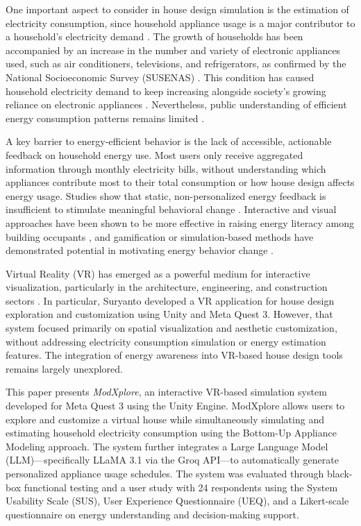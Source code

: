 \documentclass[conference]{IEEEtran}
\begin{document}
One important aspect to consider in house design simulation is the estimation of electricity consumption, since household appliance usage is a major contributor to a household's electricity demand \cite{hermadiana2025integrasi, salsabila2026pengaruh}. The growth of households has been accompanied by an increase in the number and variety of electronic appliances used, such as air conditioners, televisions, and refrigerators, as confirmed by the National Socioeconomic Survey (SUSENAS) \cite{bpssusenas}. This condition has caused household electricity demand to keep increasing alongside society's growing reliance on electronic appliances \cite{databoks2023internet}. Nevertheless, public understanding of efficient energy consumption patterns remains limited \cite{konsumsiEnergi2024}.

A key barrier to energy-efficient behavior is the lack of accessible, actionable feedback on household energy use. Most users only receive aggregated information through monthly electricity bills, without understanding which appliances contribute most to their total consumption or how house design affects energy usage. Studies show that static, non-personalized energy feedback is insufficient to stimulate meaningful behavioral change \cite{agarwal_review_residential_energy}. Interactive and visual approaches have been shown to be more effective in raising energy literacy among building occupants \cite{henni2022evaluation}, and gamification or simulation-based methods have demonstrated potential in motivating energy behavior change \cite{li2024gamification}.

Virtual Reality (VR) has emerged as a powerful medium for interactive visualization, particularly in the architecture, engineering, and construction sectors \cite{ImnersiveVR2022}. In particular, Suryanto \cite{skripsikating} developed a VR application for house design exploration and customization using Unity and Meta Quest 3. However, that system focused primarily on spatial visualization and aesthetic customization, without addressing electricity consumption simulation or energy estimation features. The integration of energy awareness into VR-based house design tools remains largely unexplored.

This paper presents \textit{ModXplore}, an interactive VR-based simulation system developed for Meta Quest 3 using the Unity Engine. ModXplore allows users to explore and customize a virtual house while simultaneously simulating and estimating household electricity consumption using the Bottom-Up Appliance Modeling approach. The system further integrates a Large Language Model (LLM)---specifically LLaMA 3.1 via the Groq API---to automatically generate personalized appliance usage schedules. The system was evaluated through black-box functional testing and a user study with 24 respondents using the System Usability Scale (SUS), User Experience Questionnaire (UEQ), and a Likert-scale questionnaire on energy understanding and decision-making support.
\end{document}
